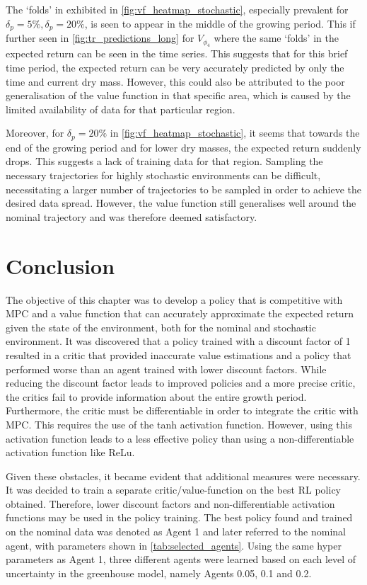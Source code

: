 The `folds' in exhibited in \autoref{fig:vf_heatmap_stochastic}, especially prevalent for $\delta_p = 5\%, \delta_p = 20\%$, is seen to appear in the middle of the growing period. This if further seen in \autoref{fig:tr_predictions_long} for $V_{\phi_4}$ where the same `folds' in the expected return can be seen in the time series. This suggests that for this brief time period, the expected return can be very accurately predicted by only the time and current dry mass. However, this could also be attributed to the poor generalisation of the value function in that specific area, which is caused by the limited availability of data for that particular region.

Moreover, for $\delta_p = 20\%$ in \autoref{fig:vf_heatmap_stochastic}, it seems that towards the end of the growing period and for lower dry masses, the expected return suddenly drops. This suggests a lack of training data for that region. Sampling the necessary trajectories for highly stochastic environments can be difficult, necessitating a larger number of trajectories to be sampled in order to achieve the desired data spread. However, the value function still generalises well around the nominal trajectory and was therefore deemed satisfactory.


\section{Conclusion}
The objective of this chapter was to develop a policy that is competitive with MPC and a value function that can accurately approximate the expected return given the state of the environment, both for the nominal and stochastic environment.
It was discovered that a policy trained with a discount factor of 1 resulted in a critic that provided inaccurate value estimations and a policy that performed worse than an agent trained with lower discount factors. While reducing the discount factor leads to improved policies and a more precise critic, the critics fail to provide information about the entire growth period. Furthermore, the critic must be differentiable in order to integrate the critic with MPC. This requires the use of the tanh activation function. However, using this activation function leads to a less effective policy than using a non-differentiable activation function like ReLu.

Given these obstacles, it became evident that additional measures were necessary. It was decided to train a separate critic/value-function on the best RL policy obtained. Therefore, lower discount factors and non-differentiable activation functions may be used in the policy training. The best policy found and trained on the nominal data was denoted as Agent 1 and later referred to the nominal agent, with parameters shown in \autoref{tab:selected_agents}. Using the same hyper parameters as Agent 1, three different agents were learned based on each level of uncertainty in the greenhouse model, namely Agents 0.05, 0.1 and 0.2. 

